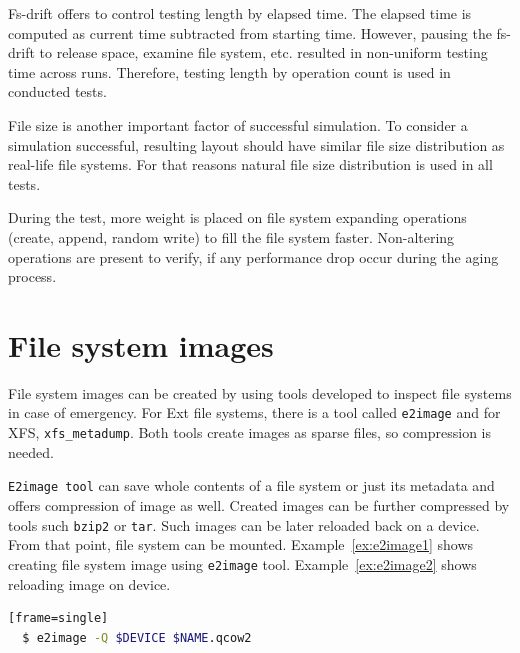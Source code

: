 \documentclass[
  color, %
  table, %
  lof,   %
  lot,   %
]{fithesis3}
\begin{document}
Fs-drift offers to control testing length by elapsed time. The elapsed time is computed as current time subtracted from starting time. However, pausing the fs-drift to release space, examine file system, etc. resulted in non-uniform testing time across runs. Therefore, testing length by operation count is used in conducted tests.

File size is another important factor of successful simulation. To consider a simulation successful, resulting layout should have similar file size distribution as real-life file systems. For that reasons natural file size distribution is used in all tests.\footnotemark[2] 


During the test, more weight is placed on file system expanding operations (create, append, random write) to fill the file system faster. Non-altering operations are present to verify, if any performance drop occur during the aging process.

\section{File system images}
File system images can be created by using tools developed to inspect file systems in case of emergency. For Ext file systems, there is a tool called \texttt{e2image} and for XFS, \texttt{xfs\_metadump}. Both tools create images as sparse files, so compression is needed.

\texttt{E2image tool} can save whole contents of a file system or just its metadata and offers compression of image as well. Created images can be further compressed by tools such \texttt{bzip2} or \texttt{tar}. Such images can be later reloaded back on a device. From that point, file system can be mounted. Example~\ref{ex:e2image1} shows creating file system image using \texttt{e2image} tool. Example~\ref{ex:e2image2} shows reloading image on device.


\begin{lstlisting}[language=bash, label={ex:e2image1}, caption={Creating compressed image using \texttt{e2image}.}][frame=single]
  $ e2image -Q $DEVICE $NAME.qcow2
\end{lstlisting}
\end{document}
